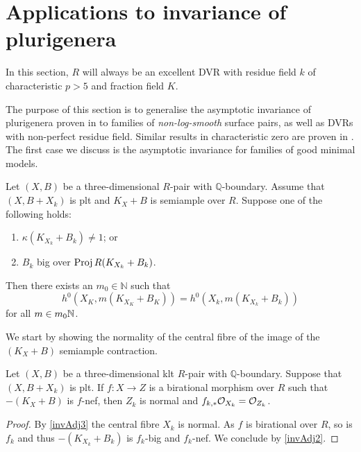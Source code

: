 \section{Applications to invariance of plurigenera}\label{s-inv-plurigenera}
	
	
	In this section, $R$ will always be an excellent DVR with residue field $k$ of characteristic $p>5$ and fraction field $K$. 
	
	The purpose of this section is to generalise the asymptotic invariance of plurigenera proven in \cite[Theorem 3.1]{EH} to families of \emph{non-log-smooth} surface pairs, as well as DVRs with non-perfect residue field. Similar results in characteristic zero are proven in \cite{HMX13, HMX18}.
	The first case we discuss is the asymptotic invariance for families of good minimal models.
	
	\begin{theorem}\label{thm:ADIOP_SA}
		Let $(X,B)$ be a three-dimensional $R$-pair with $\mathbb{Q}$-boundary.
		Assume that $(X,B+X_k)$ is plt and $K_X+B$ is semiample over $R$.
		Suppose one of the following holds:
		\begin{enumerate}
			\item $\kappa(K_{X_k}+B_k)\neq 1$; or
			\item  $B_k$ big over $\Proj R(K_{X_k}+B_k)$.
		\end{enumerate} 
		Then there exists an $m_{0} \in \mathbb{N}$ such that 
		$$h^0(X_K,m(K_{X_K}+B_K))=h^0(X_k,m(K_{X_k}+B_k))$$
		for all $m\in m_0\bN$.
	\end{theorem}
	
	We start by showing the normality of the central fibre of the image of the $(K_X+B)$ semiample contraction.
	
	\begin{proposition}\label{p-gen-case}
		Let $(X,B)$ be a three-dimensional klt $R$-pair with $\mathbb{Q}$-boundary.
		Suppose that $(X,B+X_{k})$ is plt. If $f \colon X \to Z$ is a birational morphism over $R$ such that $-(K_{X}+B)$ is $f$-nef, then $Z_k$ is normal and $f_{k,*}\ox[X_{k}]=\ox[Z_{k}]$.
	\end{proposition}
	
	\begin{proof}
		By \autoref{invAdj3} the central fibre $X_{k}$ is normal. 
		As $f$ is birational over $R$, so is $f_{k}$ and thus $-(K_{X_{k}}+B_{k})$ is $f_{k}$-big and $f_k$-nef. We conclude by \autoref{invAdj2}.
	\end{proof}
	
